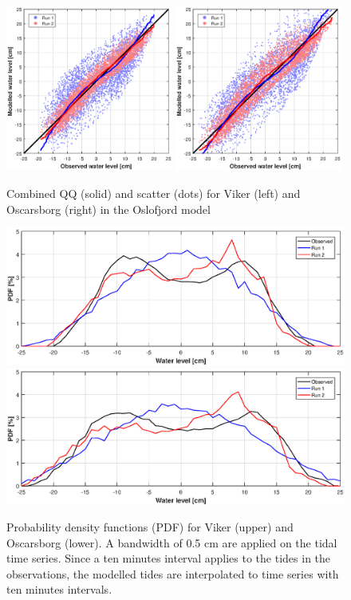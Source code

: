 \begin{figure}[!t]
\centering
\includegraphics[width=0.49\textwidth]{fig_Viker_QQ_Scatter}
\includegraphics[width=0.49\textwidth]{fig_Oscarsborg_QQ_Scatter}
\caption{Combined QQ (solid) and scatter (dots) for Viker (left) and Oscarsborg (right) in the Oslofjord model}
\label{fig:Oslo_QQ_Scatter}
\end{figure}

\begin{figure}[!t]
\centering
\includegraphics[width=\textwidth]{fig_Viker_PDF}
\includegraphics[width=\textwidth]{fig_Oscarsborg_PDF}
\caption{Probability density functions (PDF) for Viker (upper) and Oscarsborg (lower). A bandwidth of 0.5 cm are applied on the tidal time series. Since a ten minutes interval applies to the tides in the observations, the modelled tides are interpolated to time series with ten minutes intervals.}
\label{fig:Oslo_PDF}
\end{figure}


